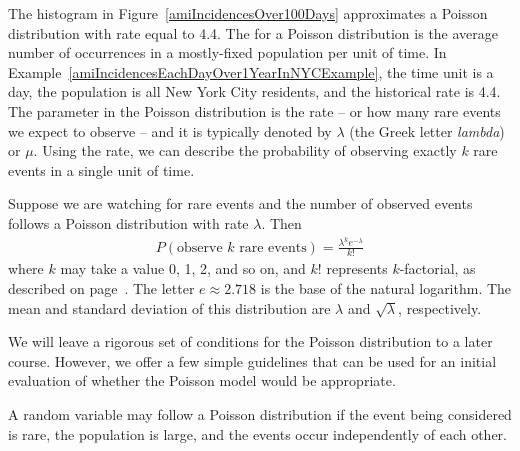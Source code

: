 The histogram in Figure~\ref{amiIncidencesOver100Days} approximates a Poisson distribution with rate equal to 4.4. The  for a Poisson distribution is the average number of occurrences in a mostly-fixed population per unit of time. In Example~\ref{amiIncidencesEachDayOver1YearInNYCExample}, the time unit is a day, the population is all New York City residents, and the historical rate is 4.4. The parameter in the Poisson distribution is the rate -- or how many rare events we expect to observe -- and it is typically denoted by $\lambda$
(the Greek letter \emph{lambda})  or $\mu$. Using the rate, we can describe the probability of observing exactly $k$ rare events in a single unit of time.

\begin{termBox}{
Suppose we are watching for rare events and the number of observed events follows a Poisson distribution with rate $\lambda$. Then
\begin{align*}
P(\text{observe $k$ rare events}) = \frac{\lambda^{k} e^{-\lambda}}{k!}
\end{align*}
where $k$ may take a value 0, 1, 2, and so on, and $k!$ represents $k$-factorial, as described on page~\pageref{factorialDefinitionInTheBinomialSection}. The letter $e\approx2.718$ is the base of the natural logarithm. The mean and standard deviation of this distribution are $\lambda$ and $\sqrt{\lambda}$, respectively.}
\end{termBox}

We will leave a rigorous set of conditions for the Poisson distribution to a later course. However, we offer a few simple guidelines that can be used for an initial evaluation of whether the Poisson model would be appropriate.

\begin{tipBox}{
A random variable may follow a Poisson distribution if the event being considered is rare, the population is large, and the events occur independently of each other.}
\end{tipBox}

